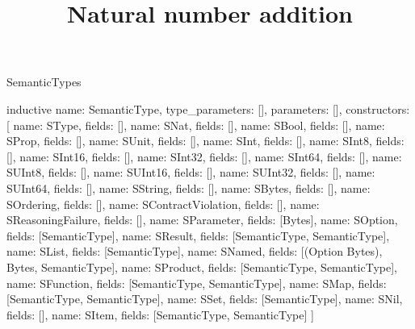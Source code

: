 \begin{lexlean}{SemanticTypes}
\title{Natural number addition}
\begin{semanticmodule}
inductive{
  name: SemanticType,
  type_parameters: [],
  parameters: [],
  constructors: [
    {name: SType, fields: []},
    {name: SNat, fields: []},
    {name: SBool, fields: []},
    {name: SProp, fields: []},
    {name: SUnit, fields: []},
    {name: SInt, fields: []},
    {name: SInt8, fields: []},
    {name: SInt16, fields: []},
    {name: SInt32, fields: []},
    {name: SInt64, fields: []},
    {name: SUInt8, fields: []},
    {name: SUInt16, fields: []},
    {name: SUInt32, fields: []},
    {name: SUInt64, fields: []},
    {name: SString, fields: []},
    {name: SBytes, fields: []},
    {name: SOrdering, fields: []},
    {name: SContractViolation, fields: []},
    {name: SReasoningFailure, fields: []},
    {name: SParameter, fields: [Bytes]},
    {name: SOption, fields: [SemanticType]},
    {name: SResult, fields: [SemanticType, SemanticType]},
    {name: SList, fields: [SemanticType]},
    {name: SNamed, fields: [(Option Bytes), Bytes, SemanticType]},
    {name: SProduct, fields: [SemanticType, SemanticType]},
    {name: SFunction, fields: [SemanticType, SemanticType]},
    {name: SMap, fields: [SemanticType, SemanticType]},
    {name: SSet, fields: [SemanticType]},
    {name: SNil, fields: []},
    {name: SItem, fields: [SemanticType, SemanticType]}
  ]
}


\end{semanticmodule}
\end{lexlean}

